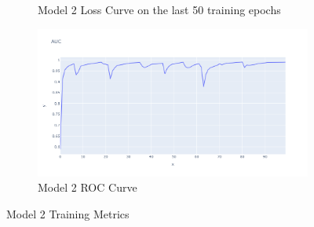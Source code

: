 \begin{figure}[H]
\begin{subfigure}{0.49\textwidth}
        \caption{Model 2 Loss Curve on the last 50 training epochs}
    \label{fig:2_ploss}
    \end{subfigure}
    \begin{subfigure}{0.49\textwidth}
        \centering
        \includegraphics[width=\linewidth]{figures/ev/2_auc.png}
        \caption{Model 2 ROC Curve}
    \label{fig:2_auc}
    \end{subfigure}
    \captionsetup{font=large}
\caption{Model 2 Training Metrics}
 \label{fig:2_tr}
\end{figure}

